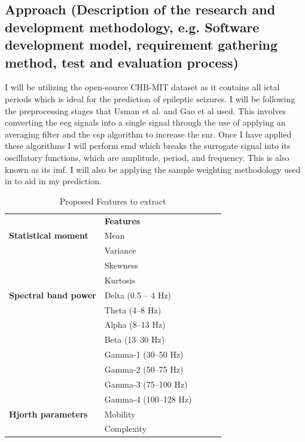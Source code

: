 \documentclass[12pt]{article}
\begin{document}
\subsection{Approach (Description of the research and development methodology, e.g. Software
development model, requirement gathering method, test and evaluation process)}

I will be utilizing the open-source CHB-MIT dataset \cite{shoeb2009application} \cite{PhysioNet} as it contains all ictal periods which is ideal for the prediction of epileptic seizures. I will be following the preprocessing stages that Usman et al. and Gao et al used. This involves converting the \acrshort{eeg} signals into a single signal through the use of applying an averaging filter and the \acrfull{csp} algorithm to increase the \acrshort{snr}. Once I have applied these algorithms I will perform \acrshort{emd} which breaks the surrogate signal into its oscillatory functions, which are amplitude, period, and frequency. This is also known as its \acrfull{imf}. I will also be applying the sample weighting methodology used in \cite{gao2022general} to aid in my prediction.

\begin{table}[H]
\centering
\begin{tabular}{lllll}
                             & \textbf{Features}    &  &  &  \\
\textbf{Statistical moment}  & Mean                 &  &  &  \\
                             & Variance             &  &  &  \\
                             & Skewness             &  &  &  \\
                             & Kurtosis             &  &  &  \\
\textbf{Spectral band power} & Delta (0.5 – 4 Hz)   &  &  &  \\
                             & Theta (4–8 Hz)       &  &  &  \\
                             & Alpha (8–13 Hz)      &  &  &  \\
                             & Beta (13–30 Hz)      &  &  &  \\
                             & Gamma-1 (30–50 Hz)   &  &  &  \\
                             & Gamma-2 (50–75 Hz)   &  &  &  \\
                             & Gamma-3 (75–100 Hz)  &  &  &  \\
                             & Gamma-4 (100–128 Hz) &  &  &  \\
\textbf{Hjorth parameters}   & Mobility             &  &  &  \\
                             & Complexity           &  &  & 
\end{tabular}
\caption{Proposed Features to extract}
\end{table}
\end{document}
